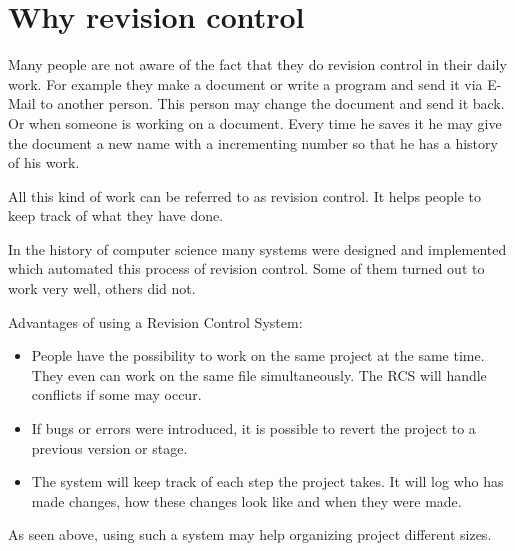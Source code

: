 \section{Why revision control}

\cite[Chapter 1]{hgbook2009}

Many people are not aware of the fact that they do revision control in their daily work. For example they make a document or write a program and send it via E-Mail to another person. This person may change the document and send it back. Or when someone is working on a document. Every time he saves it he may give the document a new name with a incrementing number so that he has a history of his work.

All this kind of work can be referred to as revision control. It helps people to keep track of what they have done.

In the history of computer science many systems were designed and implemented which automated this process of revision control. Some of them turned out to work very well, others did not.

Advantages of using a Revision Control System:
\begin{itemize}
\item People have the possibility to work on the same project at the same time. They even can work on the same file simultaneously. The RCS will handle conflicts if some may occur.
\item If bugs or errors were introduced, it is possible to revert the project to a previous version or stage.
\item The system will keep track of each step the project takes. It will log who has made changes, how these changes look like and when they were made.
\end{itemize}

As seen above, using such a system may help organizing project different sizes.
